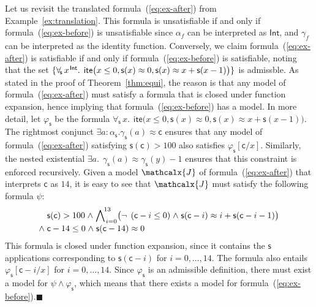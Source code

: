 \documentclass[runningheads,a4paper]{llncs}
\newcommand{\con}[1]{\mathsf{#1}}
\let\oldneg=\neg
\def\neg{\oldneg\:}
\let\oldwedge=\wedge
\def\wedge{\mathrel{\oldwedge}}
\newcommand{\teq}{\approx}
\newcommand{\I}{\mathcalx{J}} %
\newcommand{\sortint}{\ty{Int}}
\newcommand\ty[1]{\con{#1}}
\newcommand{\lite}{\con{ite}}
\newcommand\concret{\gamma} %
\newcommand{\forallf}[1]{\forall_{\!#1\:}}
\newcommand{\farg}[1]{\concret_{#1}}
\newcommand{\fargsort}[1]{\alpha_{#1}}
\newcommand{\vthinspace}{\kern+0.083333em}
\newcommand{\typ}[1]{^{\vthinspace #1}}
\newcommand\xend{{\hfill$\scriptstyle\blacksquare$}}
\begin{document}
\begin{example}
Let us revisit the translated formula~(\ref{eq:ex-after}) from
Example~\ref{ex:translation}. This formula is unsatisfiable if and only if
formula~(\ref{eq:ex-before}) is unsatisfiable since $\fargsort{f}$ can be
interpreted as $\sortint$, and $\farg{f}$ can be interpreted as the identity
function. Conversely, we claim formula~(\ref{eq:ex-after}) is satisfiable if
and only if formula~(\ref{eq:ex-before}) is satisfiable, noting that the set
$\{ \forallf{\con{s}} x\typ{\sortint}.\;\, \lite\bigl( x \leq 0, \con{s}(x)
\teq 0, \con{s}( x ) \teq x + \con{s}( x-1 ) \bigr) \}$ is admissble.
As stated
in the proof of Theorem~\ref{thm:equi}, the reason is that any model of
formula~(\ref{eq:ex-after}) must satisfy a formula that is closed under
function expansion, hence implying that formula~(\ref{eq:ex-before}) has a
model. In more detail, let $\varphi_\con{s}$ be the formula $\forallf{\con{s}} x.\;\,
\lite\bigl( x \leq 0, \con{s}(x) \teq 0, \con{s}( x ) \teq x + \con{s}( x-1 )
\bigr)$. The rightmost conjunct $\exists a : {\fargsort{\con{s}}}.
\farg{\con{s}}( a ) \teq \con{c}$ ensures that any model of
formula~(\ref{eq:ex-after}) satisfying $\con{s}( \con{c} ) > 100$ also
satisfies $\varphi_{\con{s}}[\con{c}/x]$. Similarly, the nested existential
$\exists a.\;\, \farg{\con{s}}( a ) \teq \farg{\con{s}}( y )-1$ ensures that
this constraint is enforced recursively. Given a model $\I$ of
formula~(\ref{eq:ex-after}) that interprets $\con{c}$ as $14$, it is easy to see that
$\I$ must satisfy the following formula $\psi$:
%
\begin{equation} \label{eq:fun-closure}
\begin{split}
& \con{s}( \con{c} ) > 100 \wedge %
  \bigwedge\nolimits_{\vthinspace i=0}^{\!13} \bigl( \neg (\con{c}-i \leq 0) \wedge \con{s}( \con{c}-i ) \teq i + \con{s}( \con{c}-i-1 ) \bigr) \\[-\jot]
{\wedge}\; & \con{c}-14 \leq 0 \wedge \con{s}( \con{c}-14 ) \teq 0
\end{split}
\end{equation}
%
This formula is closed under function expansion,
since it contains the $\con{s}$ applications corresponding to
$\con{s}( \con{c}-i )$ for $i = 0, \ldots, 14$. The formula also
entails $\varphi_\con{s}[\con{c}-i/x]$ for $i = 0, \ldots, 14$.
Since $\varphi_\con{s}$ is an admissible definition,
there must exist a model for $\psi \wedge \varphi_\con{s}$,
which means that there exists a model for formula~(\ref{eq:ex-before}).\xend
\end{example}
\end{document}
